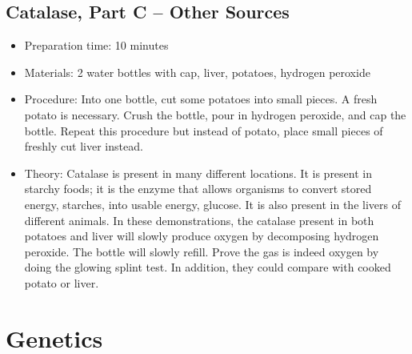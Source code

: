\subsection{Catalase, Part C -- Other Sources}
\begin{itemize}
\item{Preparation time: 10 minutes}
\item{Materials: 2 water bottles with cap, liver, potatoes, hydrogen peroxide}
\item{Procedure: Into one bottle, cut some potatoes into small pieces. A fresh potato is necessary. Crush the bottle, pour in hydrogen peroxide, and cap the bottle. Repeat this procedure but instead of potato, place small pieces of freshly cut liver instead.}
\item{Theory: Catalase is present in many different locations. It is present in starchy foods; it is the enzyme that allows organisms to convert stored energy, starches, into usable energy, glucose. It is also present in the livers of different animals. In these demonstrations, the catalase present in both potatoes and liver will slowly produce oxygen by decomposing hydrogen peroxide. The bottle will slowly refill. Prove the gas is indeed oxygen by doing the glowing splint test. In addition, they could compare with cooked potato or liver.}
\end{itemize}

\section{Genetics}
